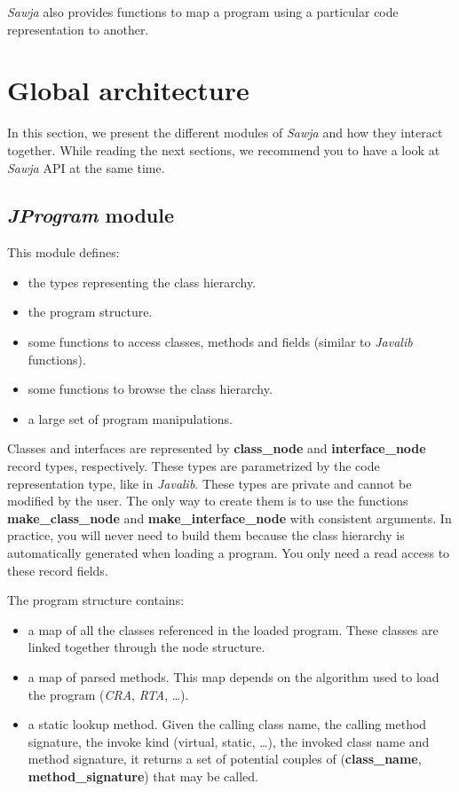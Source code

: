 \documentclass{article}
\begin{document}
\emph{Sawja} also provides functions to map a program using a
particular code representation to another.

\section{Global architecture}

In this section, we present the different modules of \emph{Sawja}
and how they interact together. While reading the next sections, we
recommend you to have a look at \emph{Sawja} API at the same time.

\subsection{\emph{JProgram} module}

This module defines:

\begin{itemize}
\item
  the types representing the class hierarchy.
\item
  the program structure.
\item
  some functions to access classes, methods and fields (similar to
  \emph{Javalib} functions).
\item
  some functions to browse the class hierarchy.
\item
  a large set of program manipulations.
\end{itemize}
Classes and interfaces are represented by \textbf{class\_node} and
\textbf{interface\_node} record types, respectively. These types
are parametrized by the code representation type, like in
\emph{Javalib}. These types are private and cannot be modified by
the user. The only way to create them is to use the functions
\textbf{make\_class\_node} and \textbf{make\_interface\_node} with
consistent arguments. In practice, you will never need to build
them because the class hierarchy is automatically generated when
loading a program. You only need a read access to these record
fields.

The program structure contains:

\begin{itemize}
\item
  a map of all the classes referenced in the loaded program. These
  classes are linked together through the node structure.
\item
  a map of parsed methods. This map depends on the algorithm used to
  load the program (\emph{CRA}, \emph{RTA}, \ldots{}).
\item
  a static lookup method. Given the calling class name, the calling
  method signature, the invoke kind (virtual, static, \ldots{}), the
  invoked class name and method signature, it returns a set of
  potential couples of (\textbf{class\_name},
  \textbf{method\_signature}) that may be called.
\end{itemize}
\end{document}
